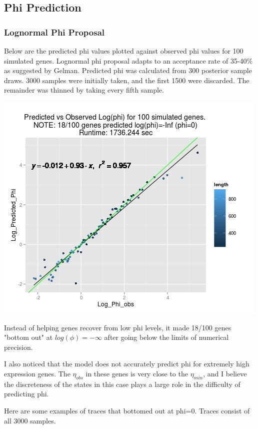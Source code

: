 \documentclass{article}
\begin{document}
 	\subsection{Phi Prediction}
 	 
 	
	\subsubsection{Lognormal Phi Proposal} 	
 	 	
 	Below are the predicted phi values plotted against observed phi values for 100 simulated genes. Lognormal phi proposal adapts to an acceptance rate of 35-40\% as suggested by Gelman. Predicted phi was calculated from 300 posterior sample draws. 3000 samples were initially taken, and the first 1500 were discarded. The remainder was thinned by taking every fifth sample. 
 	
 	\includegraphics[scale=0.5]{../chosen_100/3000_steps/BIS10/lnorm_prop/Rplot.jpeg}
 	
	 Instead of helping genes recover from low phi levels, it made 18/100 genes "bottom out" at $log(\phi)=-\infty$ after going below the limits of numerical precision. 
	 
	 I also noticed that the model does not accurately predict phi for extremely high expression genes. The $\eta_{obs}$ in these genes is very close to the $\eta_{min}$, and I believe the discreteness of the states in this case plays a large role in the difficulty of predicting phi.
 	
 	Here are some examples of traces that bottomed out at phi=0. Traces consist of all 3000 samples.
 	
\end{document}
